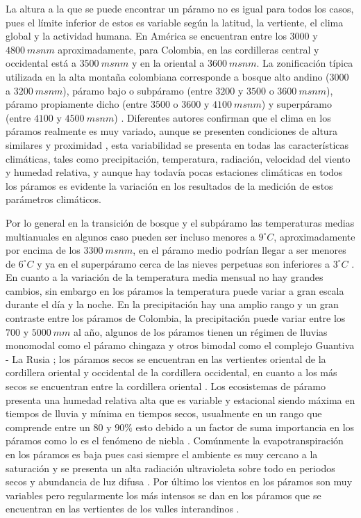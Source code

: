 \documentclass[conference,final,]{IEEEtran}
\begin{document}
La altura a la que se puede encontrar un páramo no es igual para todos
los casos, pues el límite inferior de estos es variable según la
latitud, la vertiente, el clima global y la actividad humana. En América
se encuentran entre los \(3000\) y \(4800 \ msnm\) aproximadamente, para
Colombia, en las cordilleras central y occidental está a \(3500 \ msnm\)
y en la oriental a \(3600 \ msnm\). La zonificación típica utilizada en
la alta montaña colombiana corresponde a bosque alto andino (\(3000\) a
\(3200 \ msnm\)), páramo bajo o subpáramo (entre \(3200\) y \(3500\) o
\(3600 \ msnm\)), páramo propiamente dicho (entre \(3500\) o \(3600\) y
\(4100 \ msnm\)) y superpáramo (entre \(4100\) y \(4500 \ msnm\))
\cite{ortizparamos}. Diferentes autores confirman que el clima en los
páramos realmente es muy variado, aunque se presenten condiciones de
altura similares y proximidad \cite{paramos}, esta variabilidad se
presenta en todas las características climáticas, tales como
precipitación, temperatura, radiación, velocidad del viento y humedad
relativa, y aunque hay todavía pocas estaciones climáticas en todos los
páramos es evidente la variación en los resultados de la medición de
estos parámetros climáticos.

Por lo general en la transición de bosque y el subpáramo las
temperaturas medias multianuales en algunos caso pueden ser incluso
menores a \(9^{\circ}C\), aproximadamente por encima de los
\(3300 \ msnm\), en el páramo medio podrían llegar a ser menores de
\(6^{\circ}C\) y ya en el superpáramo cerca de las nieves perpetuas son
inferiores a \(3^{\circ}C\) \cite{morales2019atlas}. En cuanto a la
variación de la temperatura media mensual no hay grandes cambios, sin
embargo en los páramos la temperatura puede variar a gran escala durante
el día y la noche. En la precipitación hay una amplio rango y un gran
contraste entre los páramos de Colombia, la precipitación puede variar
entre los \(700\) y \(5000 \ mm\) al año, algunos de los páramos tienen
un régimen de lluvias monomodal como el páramo chingaza
\cite{morales2019atlas} y otros bimodal como el complejo Guantiva - La
Rusia \cite{morales2019atlas}; los páramos secos se encuentran en las
vertientes oriental de la cordillera oriental y occidental de la
cordillera occidental, en cuanto a los más secos se encuentran entre la
cordillera oriental \cite{morales2019atlas}. Los ecosistemas de páramo
presenta una humedad relativa alta que es variable y estacional siendo
máxima en tiempos de lluvia y mínima en tiempos secos, usualmente en un
rango que comprende entre un \(80\) y \(90 \%\) esto debido a un factor
de suma importancia en los páramos como lo es el fenómeno de niebla
\cite{morales2019atlas}. Comúnmente la evapotranspiración en los páramos
es baja pues casi siempre el ambiente es muy cercano a la saturación y
se presenta un alta radiación ultravioleta sobre todo en periodos secos
y abundancia de luz difusa \cite{morales2019atlas}. Por último los
vientos en los páramos son muy variables pero regularmente los más
intensos se dan en los páramos que se encuentran en las vertientes de
los valles interandinos \cite{morales2019atlas}.
\end{document}
